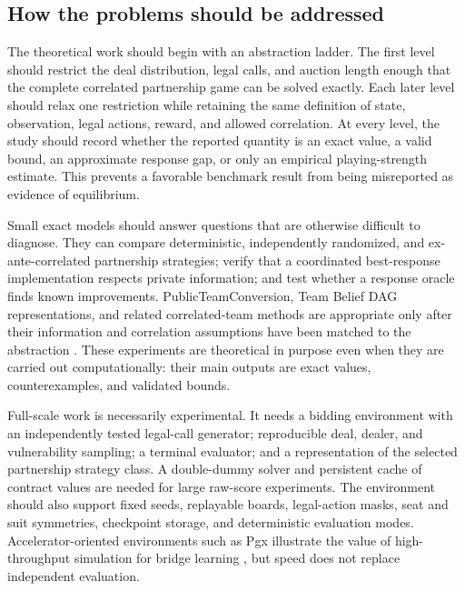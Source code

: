 \documentclass[11pt]{article}
\begin{document}
\subsection{How the problems should be addressed}

The theoretical work should begin with an abstraction ladder. The first level should restrict the deal distribution, legal calls, and auction length enough that the complete correlated partnership game can be solved exactly. Each later level should relax one restriction while retaining the same definition of state, observation, legal actions, reward, and allowed correlation. At every level, the study should record whether the reported quantity is an exact value, a valid bound, an approximate response gap, or only an empirical playing-strength estimate. This prevents a favorable benchmark result from being misreported as evidence of equilibrium.

Small exact models should answer questions that are otherwise difficult to diagnose. They can compare deterministic, independently randomized, and ex-ante-correlated partnership strategies; verify that a coordinated best-response implementation respects private information; and test whether a response oracle finds known improvements. PublicTeamConversion, Team Belief DAG representations, and related correlated-team methods are appropriate only after their information and correlation assumptions have been matched to the abstraction \cite{carminati2022marriage,zhang2023teambelief}. These experiments are theoretical in purpose even when they are carried out computationally: their main outputs are exact values, counterexamples, and validated bounds.

Full-scale work is necessarily experimental. It needs a bidding environment with an independently tested legal-call generator; reproducible deal, dealer, and vulnerability sampling; a terminal evaluator; and a representation of the selected partnership strategy class. A double-dummy solver and persistent cache of contract values are needed for large raw-score experiments. The environment should also support fixed seeds, replayable boards, legal-action masks, seat and suit symmetries, checkpoint storage, and deterministic evaluation modes. Accelerator-oriented environments such as Pgx illustrate the value of high-throughput simulation for bridge learning \cite{koyamada2023pgx}, but speed does not replace independent evaluation.
\end{document}
